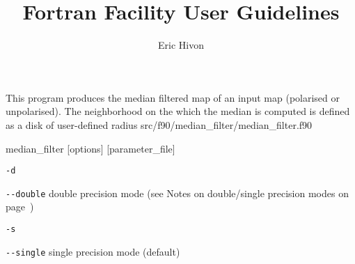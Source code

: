 
\sloppy


\title{\healpix Fortran Facility User Guidelines}
 \section[median\_filter]{\nosectionname}
\label{fac:median_filter}
\author{Eric Hivon}

\begin{facility}
{This program produces the median filtered map of an input \healpix map
  (polarised or unpolarised). The
  neighborhood on the which the median is computed is defined as a disk of
  user-defined radius}
{src/f90/median\_filter/median\_filter.f90}
\end{facility}

\begin{f90facility}
{median\_filter [options] [parameter\_file]}
\end{f90facility}

\begin{options}
  \begin{optionlistwide}{} %
    \item[{\tt -d}]
    \item[{\tt -}{\tt -}{\tt double}] double precision mode (see Notes on double/single precision modes on page~\pageref{page:ioprec})
    \item[{\tt -s}]
    \item[{\tt -}{\tt -}{\tt single}] single precision mode (default)
  \end{optionlistwide}
\end{options}

